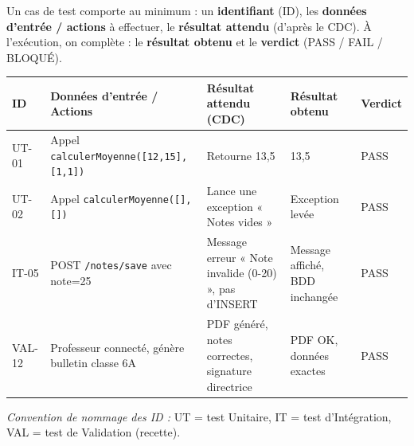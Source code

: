 \documentclass[11pt]{article}
\begin{document}
\begin{propriete}
Un cas de test comporte au minimum : un \textbf{identifiant} (ID), les \textbf{données d'entrée / actions} à effectuer, le \textbf{résultat attendu} (d'après le CDC). À l'exécution, on complète : le \textbf{résultat obtenu} et le \textbf{verdict} (PASS / FAIL / BLOQUÉ).

\begin{center}
\begin{tabularx}{\linewidth}{|l|X|X|X|l|}
\hline
\rowcolor{popblueL}
\textbf{ID} & \textbf{Données d'entrée / Actions} & \textbf{Résultat attendu (CDC)} & \textbf{Résultat obtenu} & \textbf{Verdict} \\
\hline
UT-01 & Appel \texttt{calculerMoyenne([12,15],[1,1])} & Retourne 13,5 & 13,5 & \textcolor{popgreen}{PASS} \\
\hline
UT-02 & Appel \texttt{calculerMoyenne([],[])} & Lance une exception « Notes vides » & Exception levée & \textcolor{popgreen}{PASS} \\
\hline
IT-05 & POST \texttt{/notes/save} avec note=25 & Message erreur « Note invalide (0-20) », pas d'INSERT & Message affiché, BDD inchangée & \textcolor{popgreen}{PASS} \\
\hline
VAL-12 & Professeur connecté, génère bulletin classe 6A & PDF généré, notes correctes, signature directrice & PDF OK, données exactes & \textcolor{popgreen}{PASS} \\
\hline
\end{tabularx}
\end{center}
\emph{Convention de nommage des ID :} UT = test Unitaire, IT = test d'Intégration, VAL = test de Validation (recette).
\end{propriete}
\end{document}
